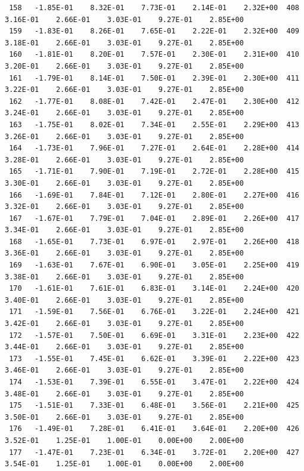 \documentclass[10pt,letterpaper,notitlepage]{article}
\numberwithin{equation}{section}
\begin{document}
\begin{appendices}
{\begin{verbatim}
 158   -1.85E-01    8.32E-01    7.73E-01    2.14E-01    2.32E+00  408    3.16E-01    2.66E-01    3.03E-01    9.27E-01    2.85E+00
 159   -1.83E-01    8.26E-01    7.65E-01    2.22E-01    2.32E+00  409    3.18E-01    2.66E-01    3.03E-01    9.27E-01    2.85E+00
 160   -1.81E-01    8.20E-01    7.57E-01    2.30E-01    2.31E+00  410    3.20E-01    2.66E-01    3.03E-01    9.27E-01    2.85E+00
 161   -1.79E-01    8.14E-01    7.50E-01    2.39E-01    2.30E+00  411    3.22E-01    2.66E-01    3.03E-01    9.27E-01    2.85E+00
 162   -1.77E-01    8.08E-01    7.42E-01    2.47E-01    2.30E+00  412    3.24E-01    2.66E-01    3.03E-01    9.27E-01    2.85E+00
 163   -1.75E-01    8.02E-01    7.34E-01    2.55E-01    2.29E+00  413    3.26E-01    2.66E-01    3.03E-01    9.27E-01    2.85E+00
 164   -1.73E-01    7.96E-01    7.27E-01    2.64E-01    2.28E+00  414    3.28E-01    2.66E-01    3.03E-01    9.27E-01    2.85E+00
 165   -1.71E-01    7.90E-01    7.19E-01    2.72E-01    2.28E+00  415    3.30E-01    2.66E-01    3.03E-01    9.27E-01    2.85E+00
 166   -1.69E-01    7.84E-01    7.12E-01    2.80E-01    2.27E+00  416    3.32E-01    2.66E-01    3.03E-01    9.27E-01    2.85E+00
 167   -1.67E-01    7.79E-01    7.04E-01    2.89E-01    2.26E+00  417    3.34E-01    2.66E-01    3.03E-01    9.27E-01    2.85E+00
 168   -1.65E-01    7.73E-01    6.97E-01    2.97E-01    2.26E+00  418    3.36E-01    2.66E-01    3.03E-01    9.27E-01    2.85E+00
 169   -1.63E-01    7.67E-01    6.90E-01    3.05E-01    2.25E+00  419    3.38E-01    2.66E-01    3.03E-01    9.27E-01    2.85E+00
 170   -1.61E-01    7.61E-01    6.83E-01    3.14E-01    2.24E+00  420    3.40E-01    2.66E-01    3.03E-01    9.27E-01    2.85E+00
 171   -1.59E-01    7.56E-01    6.76E-01    3.22E-01    2.24E+00  421    3.42E-01    2.66E-01    3.03E-01    9.27E-01    2.85E+00
 172   -1.57E-01    7.50E-01    6.69E-01    3.31E-01    2.23E+00  422    3.44E-01    2.66E-01    3.03E-01    9.27E-01    2.85E+00
 173   -1.55E-01    7.45E-01    6.62E-01    3.39E-01    2.22E+00  423    3.46E-01    2.66E-01    3.03E-01    9.27E-01    2.85E+00
 174   -1.53E-01    7.39E-01    6.55E-01    3.47E-01    2.22E+00  424    3.48E-01    2.66E-01    3.03E-01    9.27E-01    2.85E+00
 175   -1.51E-01    7.33E-01    6.48E-01    3.56E-01    2.21E+00  425    3.50E-01    2.66E-01    3.03E-01    9.27E-01    2.85E+00
 176   -1.49E-01    7.28E-01    6.41E-01    3.64E-01    2.20E+00  426    3.52E-01    1.25E-01    1.00E-01    0.00E+00    2.00E+00
 177   -1.47E-01    7.23E-01    6.34E-01    3.72E-01    2.20E+00  427    3.54E-01    1.25E-01    1.00E-01    0.00E+00    2.00E+00

\end{verbatim}}
\end{appendices}
\end{document}
